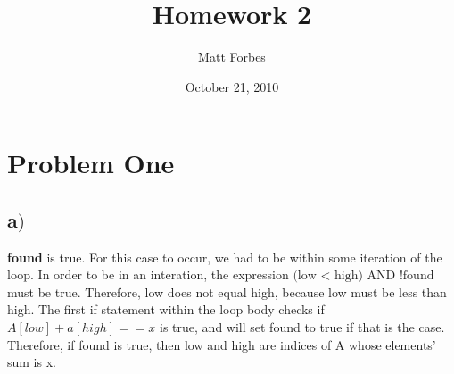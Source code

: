 \documentclass[a4paper,12pt]{article}
\begin{document}
\title{Homework 2}
\author{Matt Forbes}
\date{October 21, 2010}
\maketitle

\newenvironment{indentpar}[1]%
{\begin{list}{}%
         {\setlength{\leftmargin}{#1}}%
         \item[]%
}
{\end{list}}

\section{Problem One}
\subsection*{a\()\)}
{\bf found} is true. For this case to occur, we had to be within some iteration of the loop. In order to be in
an interation, the expression \(\text{(low < high) AND !found}\) must be true. Therefore, low does not equal
high, because low must be less than high. The first if statement within the loop body checks if\\
\(A[low] + a[high] ==  x\) is true, and will set found to true if that is the case. Therefore, if found is true,
then low and high are indices of A whose elements' sum is x.
\end{document}
